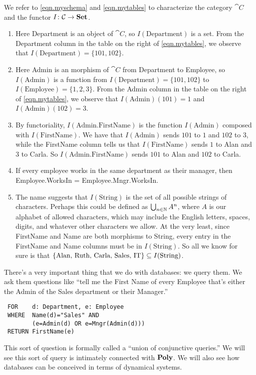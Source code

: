 \documentclass[Book-Poly]{subfiles}
\begin{document}
\begin{exercise}
\begin{solution}
We refer to \eqref{eqn.myschema} and \eqref{eqn.mytables} to characterize the category $\cat{C}$ and the functor $I \colon \cat{C} \to \smset$.
\begin{enumerate}
    \item Here Department is an object of $\cat{C}$, so $I(\text{Department})$ is a set. From the Department column in the table on the right of \eqref{eqn.mytables}, we observe that $I(\text{Department}) = \{101, 102\}$.
    \item Here Admin is an morphism of $\cat{C}$ from Department to Employee, so $I(\text{Admin})$ is a function from $I(\text{Department}) = \{101, 102\}$ to $I(\text{Employee}) = \{1, 2, 3\}$. From the Admin column in the table on the right of \eqref{eqn.mytables}, we observe that $I(\text{Admin})(101) = 1$ and $I(\text{Admin})(102) = 3$.
    \item By functoriality, $I(\text{Admin.FirstName})$ is the function $I(\text{Admin})$ composed with $I(\text{FirstName})$.
    We have that $I(\text{Admin})$ sends $101$ to $1$ and $102$ to $3$, while the FirstName column tells us that $I(\text{FirstName})$ sends $1$ to Alan and $3$ to Carla.
    So $I(\text{Admin.FirstName})$ sends $101$ to Alan and $102$ to Carla.
    \item If every employee works in the same department as their manager, then Employee.WorksIn = Employee.Mngr.WorksIn.
    \item The name suggests that $I(\text{String})$ is the set of all possible strings of characters.
    Perhaps this could be defined as $\bigcup_{n \in \nn} A^n$, where $A$ is our alphabet of allowed characters, which may include the English letters, spaces, digits, and whatever other characters we allow.
    At the very least, since FirstName and Name are both morphisms to String, every entry in the FirstName and Name columns must be in $I(\text{String})$.
    So all we know for sure is that $\{\text{Alan, Ruth, Carla, Sales, IT}\} \ss I(\text{String})$.
\end{enumerate}
\end{solution}
\end{exercise}

There's a very important thing that we do with databases: we query them. We ask them questions like ``tell me the First Name of every Employee that's either the Admin of the Sales department or their Manager.''
\begin{verbatim}
 FOR    d: Department, e: Employee
 WHERE  Name(d)="Sales" AND
        (e=Admin(d) OR e=Mngr(Admin(d)))
 RETURN FirstName(e)
\end{verbatim}
This sort of question is formally called a ``union of conjunctive queries.'' We will see this sort of query is intimately connected with $\poly$.
We will also see how databases can be conceived in terms of dynamical systems.
\end{document}
